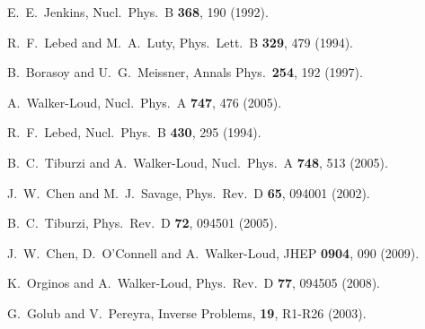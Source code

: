 \documentclass[twocolumn,nofootinbib,prd,aps,superscriptaddress,tightenlines]{revtex4}
\begin{document}
\begin{thebibliography}{99}
  E.~E.~Jenkins,
  Nucl.\ Phys.\  B {\bf 368}, 190 (1992).

  R.~F.~Lebed and M.~A.~Luty,
  Phys.\ Lett.\  B {\bf 329}, 479 (1994).

  B.~Borasoy and U.~G.~Meissner,
  Annals Phys.\  {\bf 254}, 192 (1997).

  A.~Walker-Loud,
  Nucl.\ Phys.\  A {\bf 747}, 476 (2005).

  R.~F.~Lebed,
  Nucl.\ Phys.\  B {\bf 430}, 295 (1994).

  B.~C.~Tiburzi and A.~Walker-Loud,
  Nucl.\ Phys.\  A {\bf 748}, 513 (2005).

  J.~W.~Chen and M.~J.~Savage,
  Phys.\ Rev.\  D {\bf 65}, 094001 (2002).

  B.~C.~Tiburzi,
  Phys.\ Rev.\  D {\bf 72}, 094501 (2005).

  J.~W.~Chen, D.~O'Connell and A.~Walker-Loud,
  JHEP {\bf 0904}, 090 (2009).

  K.~Orginos and A.~Walker-Loud,
  Phys.\ Rev.\  D {\bf 77}, 094505 (2008).

  G.~Golub and V.~Pereyra,
  Inverse Problems, {\bf 19}, R1-R26 (2003).  
    
\end{thebibliography}
\end{document}
